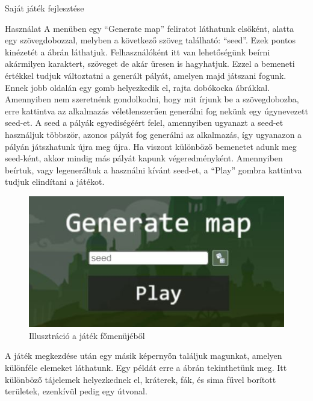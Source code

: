 \begin{MyChapter}{Saját játék fejlesztése}
\begin{MySection}{Használat}
		A menüben egy ``Generate map'' feliratot láthatunk elsőként, alatta egy szövegdobozzal, melyben a következő szöveg található: ``seed''. Ezek pontos kinézetét a  ábrán láthatjuk. Felhasználóként itt van lehetőségünk beírni akármilyen karaktert, szöveget de akár üresen is hagyhatjuk. Ezzel a bemeneti értékkel tudjuk változtatni a generált pályát, amelyen majd játszani fogunk.
		Ennek jobb oldalán egy gomb helyezkedik el, rajta dobókocka ábrákkal. Amennyiben nem szeretnénk gondolkodni, hogy mit írjunk be a szövegdobozba, erre kattintva az alkalmazás véletlenszerűen generálni fog nekünk egy úgynevezett seed-et.
		A seed a pályák egyediségéért felel, amennyiben ugyanazt a seed-et használjuk többször, azonos pályát fog generálni az alkalmazás, így ugyanazon a pályán játszhatunk újra meg újra. Ha viszont különböző bemenetet adunk meg seed-ként, akkor mindig más pályát kapunk végeredményként. 
		Amennyiben beírtuk, vagy legeneráltuk a használni kívánt seed-et, a ``Play'' gombra kattintva tudjuk elindítani a játékot.
		
		\begin{figure}[H]
			\centering
			\includegraphics[scale=0.63]{kepek/jatekHasznalat/fomenu}
			\caption{Illusztráció a játék főmenüjéből}
			\label{fig:jatekHasznalat:fomenu}
		\end{figure}
		
		A játék megkezdése után egy másik képernyőn találjuk magunkat, amelyen különféle elemeket láthatunk. Egy példát erre a  ábrán tekinthetünk meg. Itt különböző tájelemek helyezkednek el, kráterek, fák, és sima fűvel borított területek, ezenkívül pedig egy útvonal. 
		

\end{MySection}
\end{MyChapter}
